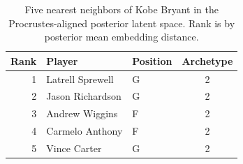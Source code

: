 \begin{table}[htbp]
  \centering\small
  \begin{tabular}{rllc}
    \toprule
    Rank & Player & Position & Archetype \\
    \midrule
    1 & Latrell Sprewell & G & 2 \\
    2 & Jason Richardson & G & 2 \\
    3 & Andrew Wiggins & F & 2 \\
    4 & Carmelo Anthony & F & 2 \\
    5 & Vince Carter & G & 2 \\
    \bottomrule
  \end{tabular}
  \caption{Five nearest neighbors of Kobe Bryant in the Procrustes-aligned posterior latent space. Rank is by posterior mean embedding distance.}
  \label{tab:Kobe_Bryant_neighbors}
\end{table}


